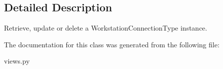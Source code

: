 \subsection{Detailed Description}
Retrieve, update or delete a Workstation\+Connection\+Type instance. 



The documentation for this class was generated from the following file\+:\begin{DoxyCompactItemize}
\item 
views.\+py\end{DoxyCompactItemize}
